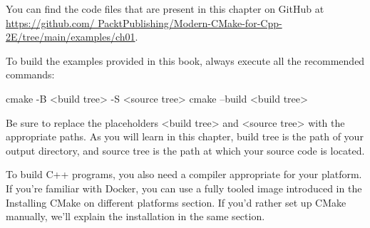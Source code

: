 You can find the code files that are present in this chapter on GitHub at \url{https://github.com/ PacktPublishing/Modern-CMake-for-Cpp-2E/tree/main/examples/ch01}.

To build the examples provided in this book, always execute all the recommended commands:

\begin{shell}
cmake -B <build tree> -S <source tree>
cmake --build <build tree>
\end{shell}

Be sure to replace the placeholders <build tree> and <source tree> with the appropriate paths. As you will learn in this chapter, build tree is the path of your output directory, and source tree is the path at which your source code is located.

To build C++ programs, you also need a compiler appropriate for your platform. If you’re familiar with Docker, you can use a fully tooled image introduced in the Installing CMake on different platforms section. If you’d rather set up CMake manually, we’ll explain the installation in the same section.











